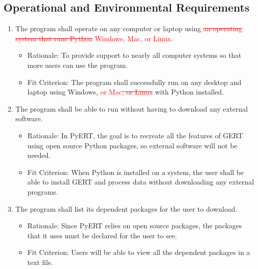 \documentclass[12pt, titlepage]{article}
\begin{document}
\subsection{Operational and Environmental Requirements}
\begin{enumerate}[{OE}1. ]
\item \label{OE1} The program shall operate on any computer or laptop using \textcolor{red}{\sout{an operating system that runs Python} Windows, Mac, or Linux}.
    \begin{itemize}  
        \item Rationale: To provide support to nearly all computer systems so that more users can use the program.
        \item Fit Criterion: The program shall successfully run on any desktop and laptop using Windows, \textcolor{red}{or Mac}\textcolor{red}{\sout{, or Linux}} with Python installed.
    \end{itemize} 

\item \label{OE2} The program shall be able to run without having to download any external software.
    \begin{itemize}  
        \item Rationale: In PyERT, the goal is to recreate all the features of GERT using open source Python packages, so external software will not be needed.
        \item Fit Criterion: When Python is installed on a system, the user shall be able to install GERT and process data without downloading any external programs.
    \end{itemize} 

\item \label{OE3} The program shall list its dependent packages for the user to download.
    \begin{itemize}  
        \item Rationale: Since PyERT relies on open source packages, the packages that it uses must be declared for the user to see.
        \item Fit Criterion: Users will be able to view all the dependent packages in a text file.
    \end{itemize} 
\end{enumerate}
\end{document}
